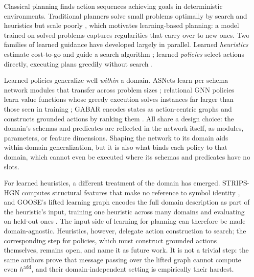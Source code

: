 \documentclass{article} %
\begin{document}
Classical planning finds action sequences achieving goals in deterministic
environments. Traditional planners solve small problems optimally by search
and heuristics but scale poorly \citep{complexity-planning, fast_downward},
which motivates learning-based planning: a model trained on solved problems
captures regularities that carry over to new ones. Two families of learned
guidance have developed largely in parallel.
Learned \emph{heuristics} estimate cost-to-go and guide a search algorithm
\citep{strips_hgn, karia2021learning, goose_v2}; learned \emph{policies}
select actions directly, executing plans greedily without search
\citep{toyer2020asnets, expressive_v1, gabar}.

Learned policies generalize well \emph{within} a domain. ASNets learn
per-schema network modules that transfer across problem sizes
\citep{toyer2020asnets}; relational GNN policies learn value functions whose
greedy execution solves instances far larger than those seen in training
\citep{expressive_v1, policy_beyond_c2}; GABAR encodes states as
action-centric graphs and constructs grounded actions by ranking them
\citep{gabar}. All share a design choice: the domain's schemas and
predicates are reflected in the network itself, as modules, parameters, or
feature dimensions. Shaping the network to its domain aids within-domain
generalization, but it is also what binds each policy to that domain, which
cannot even be executed where its schemas and predicates have no slots.

For learned heuristics, a different treatment of the domain has emerged.
STRIPS-HGN computes structural features that make no reference to symbol
identity \citep{strips_hgn}, and GOOSE's lifted learning graph encodes the
full domain description as part of the heuristic's input, training one
heuristic across many domains and evaluating on held-out ones
\citep{goose_v2}. The input side of learning for planning can therefore be
made domain-agnostic. Heuristics, however, delegate action construction to
search; the corresponding step for policies, which must construct grounded
actions themselves, remains open, and \citet{goose_v2} name it as future
work. It is not a trivial step: the same authors prove that message passing
over the lifted graph cannot compute even $h^{\mathrm{add}}$, and their
domain-independent setting is empirically their hardest.
\end{document}
